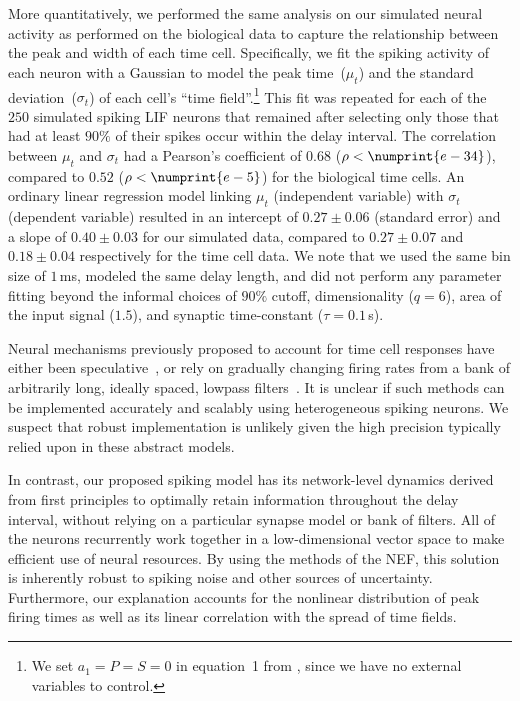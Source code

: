 More quantitatively, we performed the same analysis on our simulated neural activity as \citet{tiganj2016sequential} performed on the biological data to capture the relationship between the peak and width of each time cell.
Specifically, we fit the spiking activity of each neuron with a Gaussian to model the peak time~($\mu_t$) and the standard deviation~($\sigma_t$) of each cell's ``time field''.\footnote{%
We set $a_1 = P = S = 0$ in equation~1 from \citet{tiganj2016sequential}, since we have no external variables to control.
}
This fit was repeated for each of the $250$ simulated spiking LIF neurons that remained after selecting only those that had at least $90\%$ of their spikes occur within the delay interval.
The correlation between $\mu_t$ and $\sigma_t$ had a Pearson's coefficient of $0.68$ ($\rho < \numprint{e-34}$), compared to $0.52$ ($\rho < \numprint{e-5}$) for the biological time cells.
An ordinary linear regression model linking $\mu_t$ (independent variable) with $\sigma_t$ (dependent variable) resulted in an intercept of $0.27 \pm 0.06$ (standard error) and a slope of $0.40 \pm 0.03$ for our simulated data, compared to $0.27 \pm 0.07$ and $0.18 \pm 0.04$ respectively for the time cell data.
We note that we used the same bin size of $1$\,ms, modeled the same delay length, and did not perform any parameter fitting beyond the informal choices of $90\%$ cutoff, dimensionality ($q=6$), area of the input signal ($1.5$), and synaptic time-constant ($\tau = 0.1$\,s).

Neural mechanisms previously proposed to account for time cell responses have either been speculative~\citep{tiganj2016sequential},
or rely on gradually changing firing rates from a bank of arbitrarily long, ideally spaced, lowpass filters~\citep{shankar2012scale, howard2014unified, tiganj2015simple, tiganj2017neural}.
It is unclear if such methods can be implemented accurately and scalably using heterogeneous spiking neurons.
We suspect that robust implementation is unlikely given the high precision typically relied upon in these abstract models.

In contrast, our proposed spiking model has its network-level dynamics derived from first principles to optimally retain information throughout the delay interval, without relying on a particular synapse model or bank of filters.
All of the neurons recurrently work together in a low-dimensional vector space to make efficient use of neural resources.
By using the methods of the NEF, this solution is inherently robust to spiking noise and other sources of uncertainty.
Furthermore, our explanation accounts for the nonlinear distribution of peak firing times as well as its linear correlation with the spread of time fields.

